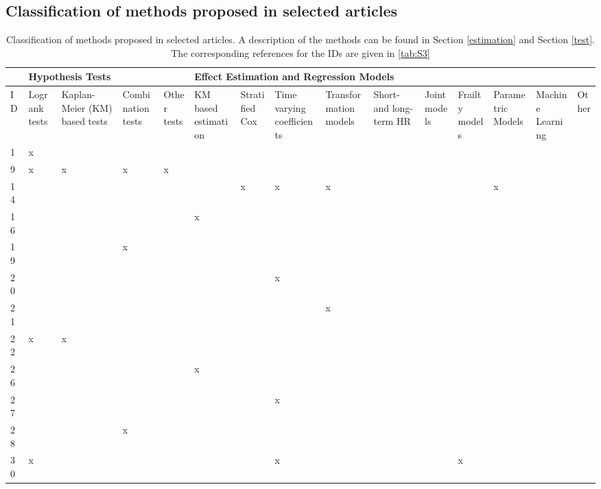 \begin{landscape}

\subsection{Classification of methods proposed in selected articles}\label{S.TableS1}

\begin{longtable}{|p{0.2in}|p{0.3in}|p{0.41in}|p{0.4in}|p{0.3in}|p{0.31in}|p{0.3in}|p{0.3in}|p{0.375in}|p{0.3in}|p{0.3in}|p{0.35in}|p{0.35in}|p{0.4in}|p{0.3in}|}%
\caption{Classification of methods proposed in selected articles. A description of the methods can be found in Section \ref{estimation} and Section \ref{test}. The corresponding references for the IDs are given in \ref{tab:S3}}
\label{tab:S1}
\\
\hline \textbf{} & \multicolumn{4}{|p{1.2in}|}{\textbf{Hypothesis Tests}} & \multicolumn{10}{|p{4in}|}{\textbf{Effect Estimation and Regression Models}} \\\hline 
  ID & 
  Log\-rank tests & Kaplan-Meier (KM) based tests & 
  Combi\-nation tests & Other tests & 
  KM based estimation & Strat\-ified Cox & 
  Time vary\-ing coefficients & Trans\-for\-mation models & 
  Short- and long-term HR & 
  Joint models & Frailty models & 
  Para\-metric Models & Ma\-chine Learning & 
  Other \\ 
  \hline
 1 & x &  &  &  &  &  &  &  &  &  &  &  &  &  \\ \hline 
 9 & x & x & x & x &  &  &  &  &  &  &  &  &  &  \\ \hline 
 14 &  &  &  &  &  & x & x & x &  &  &  & x &  &   \\ \hline 
 16 &  &  &  &  & x &  &  &  &  &  &  &  &  &  \\  \hline
 19 &  &  & x &  &  &  &  &  &  &  &  &  &  &  \\  \hline
 20 &  &  &  &  &  &  & x &  &  &  &  &  &  &  \\  \hline
 21 &  &  &  &  &  &  &  & x &  &  & \NEW{ } &  &  &  \\  \hline
 22 & x & x &  &  &  &  &  &  &  &  &  &  &  &  \\  \hline
 26 &  &  &  &  & x &  &  &  &  &  &  &  &  &  \\  \hline
 27 &  &  &  &  &  &  & x &  &  &  &  &  &  &  \\  \hline
 28 &  &  & x &  &  &  &  &  &  &  &  &  &  &  \\  \hline
 30 & x &  &  &  &  &  & x &  &  &  & x &  &  &  \\  \hline

\end{longtable}
\end{landscape}

